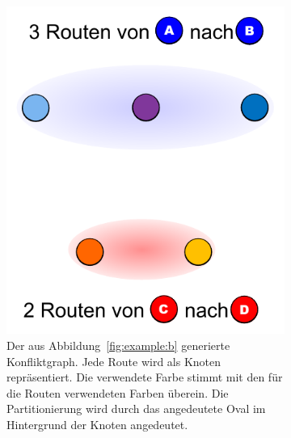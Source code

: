 \begin{figure}
	\centering
	\begin{subfigure}[t]{0.3\textwidth}
		\includegraphics[width=\textwidth]{img/bsp3}
		\caption{Der aus Abbildung~\ref{fig:example:b} generierte Konfliktgraph. Jede Route wird als Knoten repräsentiert. Die verwendete Farbe stimmt mit den
		für die Routen verwendeten Farben überein. Die Partitionierung wird durch das angedeutete Oval im Hintergrund der Knoten angedeutet.}
		\label{fig:example:c}
	\end{subfigure}
	\begin{subfigure}[t]{0.3\textwidth}

\end{subfigure}
\end{figure}

